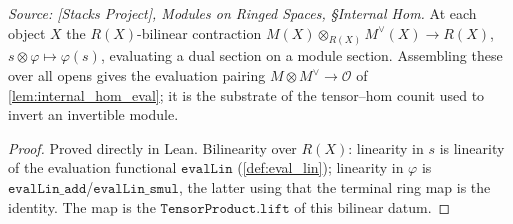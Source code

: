 \begin{definition}\leanok
  \label{def:internal_hom_eval}
  \textit{Source: [Stacks Project], Modules on Ringed Spaces, \S Internal Hom.}
  At each object \(X\) the \(R(X)\)-bilinear contraction \(M(X) \otimes_{R(X)}
  M^\vee(X) \to R(X)\), \(s \otimes \varphi \mapsto \varphi(s)\), evaluating a dual
  section on a module section. Assembling these over all opens gives the evaluation
  pairing \(M \otimes M^\vee \to \mathcal{O}\) of \cref{lem:internal_hom_eval}; it is the
  substrate of the tensor--hom counit used to invert an invertible module.
\end{definition}
\begin{proof}
  \leanok
  Proved directly in Lean. Bilinearity over \(R(X)\): linearity in \(s\) is linearity of
  the evaluation functional \(\mathtt{evalLin}\) (\cref{def:eval_lin}); linearity in
  \(\varphi\) is \(\mathtt{evalLin\_add}\)/\(\mathtt{evalLin\_smul}\), the latter using
  that the terminal ring map is the identity. The map is the
  \(\mathtt{TensorProduct.lift}\) of this bilinear datum.
\end{proof}

